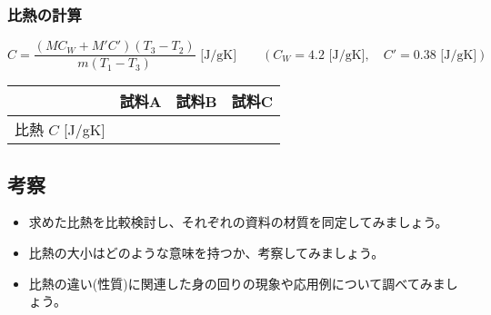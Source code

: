 \subsubsection*{比熱の計算}
\[
C = \frac{(M C_W+M'C') (T_3-T_2)}{m (T_1-T_3) } \,\,  \text{[J/gK]}
\qquad
(C_W = 4.2\,\,\text{[J/gK]}, \quad C' = 0.38\,\,\text{[J/gK]})
\]
\hspace*{-\parindent}
\begin{tabular}{|l|p{4cm}|p{4cm}|p{4cm}|}
\hline
 & 試料A & 試料B & 試料C \\
\hline
比熱 $C$ [J/gK] & & & \\
\hline
\end{tabular}

\newpage

\subsection*{考察}

\begin{itemize}

\item 求めた比熱を比較検討し、それぞれの資料の材質を同定してみましょう。

\vspace{6cm}

\item 比熱の大小はどのような意味を持つか、考察してみましょう。

\vspace{6cm}

\item 比熱の違い(性質)に関連した身の回りの現象や応用例について調べてみましょう。


\end{itemize}
